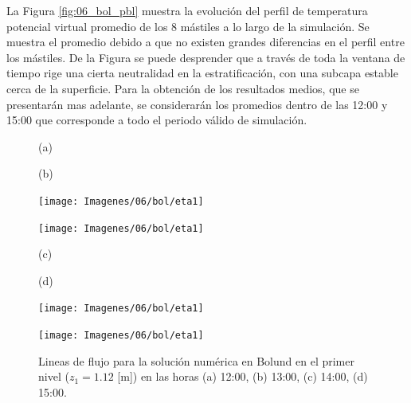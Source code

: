 La Figura \ref{fig:06_bol_pbl} muestra la evolución del perfil de temperatura potencial virtual promedio de los 8 mástiles a lo largo de la simulación. Se muestra el promedio debido a que no existen grandes diferencias en el perfil entre los mástiles. De la Figura se puede desprender que a través de toda la ventana de tiempo rige una cierta neutralidad en la estratificación, con una subcapa estable cerca de la superficie. Para la obtención de los resultados medios, que se presentarán mas adelante, se considerarán los promedios dentro de las 12:00 y 15:00 que corresponde a todo el periodo válido de simulación.

\begin{figure}[H]
	\begin{minipage}{0.5\linewidth}
		\centering
		\hspace{1cm}(a)
	\end{minipage}%
	\begin{minipage}{0.5\linewidth}
		\centering
		\hspace{-1cm}(b)
	\end{minipage}%
	
	\begin{minipage}{0.5\linewidth}
		\centering
		\texttt{[image: Imagenes/06/bol/eta1]}%
	\end{minipage}%
	\begin{minipage}{0.5\linewidth}
		\centering
		\texttt{[image: Imagenes/06/bol/eta1]}%
	\end{minipage}%
	\vspace{1mm}
	
	\begin{minipage}{0.5\linewidth}
		\centering
		\hspace{1cm}(c)
	\end{minipage}%
	\begin{minipage}{0.5\linewidth}
		\centering
		\hspace{-1cm}(d)
	\end{minipage}%
	
	\begin{minipage}{0.5\linewidth}
		\centering
		\texttt{[image: Imagenes/06/bol/eta1]}%
	\end{minipage}%
	\begin{minipage}{0.5\linewidth}
		\centering
		\texttt{[image: Imagenes/06/bol/eta1]}%
	\end{minipage}%
	\caption{Lineas de flujo para la solución numérica en Bolund en el primer nivel ($z_1 = 1.12$ [m]) en las horas (a) 12:00, (b) 13:00, (c) 14:00, (d) 15:00.}
	\label{fig:06_bol_st}
\end{figure}

